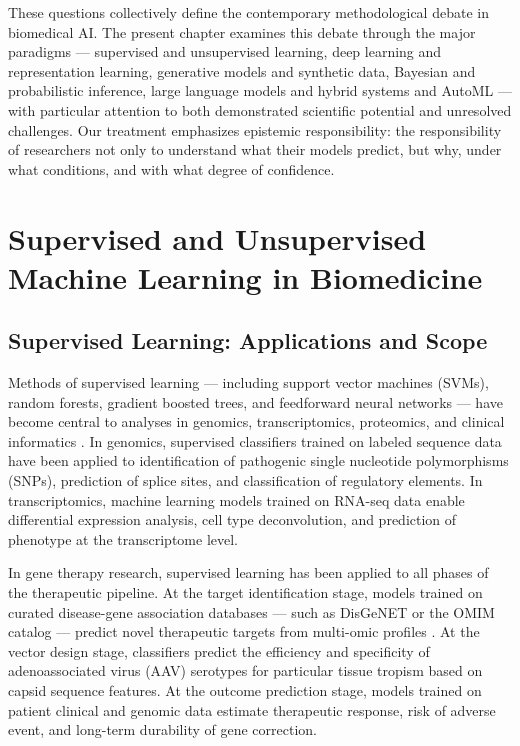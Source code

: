 These questions collectively define the contemporary methodological debate in biomedical AI. The present chapter examines this debate through the major paradigms --- supervised and unsupervised learning, deep learning and representation learning, generative models and synthetic data, Bayesian and probabilistic inference, large language models and hybrid systems and AutoML --- with particular attention to both demonstrated scientific potential and unresolved challenges. Our treatment emphasizes epistemic responsibility: the responsibility of researchers not only to understand what their models predict, but why, under what conditions, and with what degree of confidence.

\section{Supervised and Unsupervised Machine Learning in Biomedicine}

\subsection{Supervised Learning: Applications and Scope}

Methods of supervised learning --- including support vector machines (SVMs), random forests, gradient boosted trees, and feedforward neural networks --- have become central to analyses in genomics, transcriptomics, proteomics, and clinical informatics \parencite{libbrecht2015}. In genomics, supervised classifiers trained on labeled sequence data have been applied to identification of pathogenic single nucleotide polymorphisms (SNPs), prediction of splice sites, and classification of regulatory elements. In transcriptomics, machine learning models trained on RNA-seq data enable differential expression analysis, cell type deconvolution, and prediction of phenotype at the transcriptome level.

In gene therapy research, supervised learning has been applied to all phases of the therapeutic pipeline. At the target identification stage, models trained on curated disease-gene association databases --- such as DisGeNET or the OMIM catalog --- predict novel therapeutic targets from multi-omic profiles \parencite{danaeifar2025}. At the vector design stage, classifiers predict the efficiency and specificity of adenoassociated virus (AAV) serotypes for particular tissue tropism based on capsid sequence features. At the outcome prediction stage, models trained on patient clinical and genomic data estimate therapeutic response, risk of adverse event, and long-term durability of gene correction.

